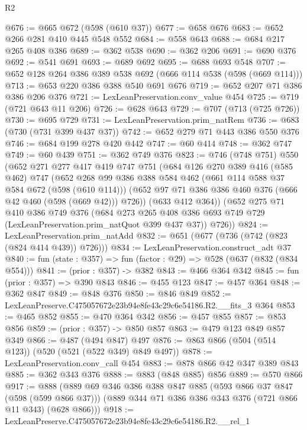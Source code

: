 \begin{lexlean}{R2}
\begin{coremodule}
@676 := @665 @672 (@598 (@610 @37))
@677 := @658 @676
@683 := @652 @266 @281 @410 @445 @548 @552
@684 := @558 @643
@688 := @684 @217 @265 @408 @386
@689 := @362 @538
@690 := @362 @206
@691 := @690 @376
@692 := @541 @691
@693 := @689 @692
@695 := @688 @693 @548
@707 := @652 @128 @264 @386 @389 @538 @692 (@666 @114 @538 (@598 (@669 @114)))
@713 := @653 @220 @386 @388 @540 @691 @676
@719 := @652 @207 @71 @386 @386 @206 @376
@721 := LexLeanPreservation.conv_value @454
@725 := @719 (@721 @643 @11 @206)
@726 := @628 @643
@729 := @707 (@713 (@725 @726))
@730 := @695 @729
@731 := LexLeanPreservation.prim_natRem
@736 := @683 (@730 (@731 @399 @437 @37))
@742 := @652 @279 @71 @443 @386 @550 @376
@746 := @684 @199 @278 @420 @442
@747 := @60 @414
@748 := @362 @747
@749 := @60 @439
@751 := @362 @749 @376
@823 := @746
    (@748 @751)
    @550
    (@652
      @271
      @277
      @417
      @419
      @747
      @751
      (@684
        @126
        @270
        @389
        @416
        (@585 @462)
        @747
        (@652
          @268
          @99
          @386
          @388
          @584
          @462
          (@661 @114 @588 @37 @584 @672 (@598 (@610 @114)))
          (@652 @97 @71 @386 @386 @460 @376 (@666 @42 @460 (@598 (@669 @42))) @726))
        (@633 @412 @364))
      (@652
        @275
        @71
        @410
        @386
        @749
        @376
        (@684 @273 @265 @408 @386 @693 @749 @729 (LexLeanPreservation.prim_natQuot @399 @437 @37))
        @726))
@824 := LexLeanPreservation.prim_natAdd
@832 := @651 (@677 (@736 (@742 (@823 (@824 @414 @439)) @726)))
@834 := LexLeanPreservation.construct_adt @37
@840 := fun (state : @357) => fun (factor : @29) => @528 (@637 (@832 (@834 @554)))
@841 := (prior : @357) -> @382
@843 := @466 @364 @342
@845 := fun (prior : @357) => @390 @843
@846 := @455 @123
@847 := @457 @364
@848 := @362 @847
@849 := @848 @376
@850 := @846 @849
@852 := LexLeanPreserve.C475057672e23b94e8fe43c29c6e54186.R2.__fits_3 @364
@853 := @465 @852
@855 := @470 @364 @342
@856 := @457 @855
@857 := @853 @856
@859 := (prior : @357) -> @850 @857
@863 := @479 @123 @849 @857 @349
@866 := @487 (@494 @847) @497
@876 := @863 @866 (@504 (@514 @123)) (@520 (@521 (@522 @349) @849 @497))
@878 := LexLeanPreservation.conv_call @454
@883 := @878 @866 @42 @347 @389 @843
@885 := @362 @343 @376
@888 := @883 (@848 @885) @856
@889 := @570 @866
@917 := @888
    (@889
      @69
      @346
      @386
      @388
      @847
      @885
      (@593 @866 @37 @847 (@598 (@599 @866 @37)))
      (@889 @344 @71 @386 @386 @343 @376 (@721 @866 @11 @343) (@628 @866)))
@918 := LexLeanPreserve.C475057672e23b94e8fe43c29c6e54186.R2.__rel_1

\end{coremodule}
\end{lexlean}

